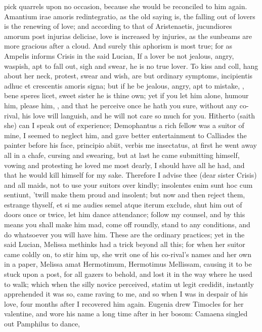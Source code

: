 pick quarrels upon no occasion, because she would be reconciled to him
again. Amantium irae amoris redintegratio, as the old saying is, the
falling out of lovers is the renewing of love; and according to that of
Aristenaetis, jucundiores amorum post injurias deliciae, love is
increased by injuries, as the sunbeams are more gracious after a cloud.
And surely this aphorism is most true; for as Ampelis informs Crisis in
the said Lucian, If a lover be not jealous, angry, waspish, apt
to fall out, sigh and swear, he is no true lover. To kiss and coll,
hang about her neck, protest, swear and wish, are but ordinary
symptoms, incipientis adhuc et crescentis amoris signa; but if he be
jealous, angry, apt to mistake, \etc{}, bene speres licet, sweet sister he
is thine own; yet if you let him alone, humour him, please him, \etc{},
and that he perceive once he hath you sure, without any co-rival, his
love will languish, and he will not care so much for you. Hitherto
(saith she) can I speak out of experience; Demophantus a rich fellow
was a suitor of mine, I seemed to neglect him, and gave better
entertainment to Calliades the painter before his face, principio
abiit, verbis me insectatus, at first he went away all in a chafe,
cursing and swearing, but at last he came submitting himself, vowing
and protesting he loved me most dearly, I should have all he had, and
that he would kill himself for my sake. Therefore I advise thee (dear
sister Crisis) and all maids, not to use your suitors over kindly;
insolentes enim sunt hoc cum sentiunt, 'twill make them proud and
insolent; but now and then reject them, estrange thyself, et si me
audies semel atque iterum exclude, shut him out of doors once or twice,
let him dance attendance; follow my counsel, and by this means
you shall make him mad, come off roundly, stand to any
conditions, and do whatsoever you will have him. These are the ordinary
practices; yet in the said Lucian, Melissa methinks had a trick beyond
all this; for when her suitor came coldly on, to stir him up, she writ
one of his co-rival's names and her own in a paper, Melissa amat
Hermotimum, Hermotimus Mellissam, causing it to be stuck upon a post,
for all gazers to behold, and lost it in the way where he used to walk;
which when the silly novice perceived, statim ut legit credidit,
instantly apprehended it was so, came raving to me, \etc{} and so
when I was in despair of his love, four months after I recovered him
again. Eugenia drew Timocles for her valentine, and wore his name a
long time after in her bosom: Camaena singled out Pamphilus to dance,
